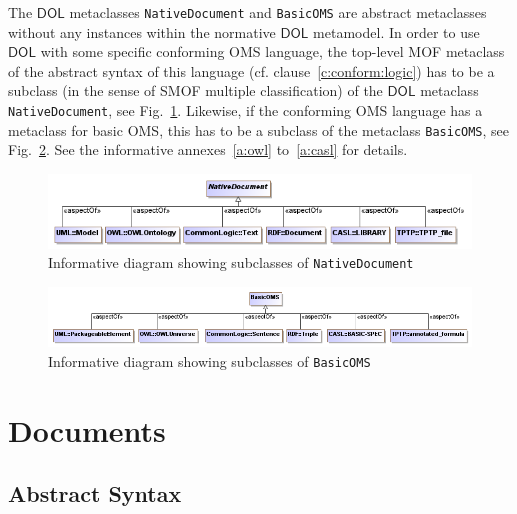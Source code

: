 \documentclass[10pt,fleqn,final]{scrreprt}
\makeatletter
\newcommand*{\cf}{cf.\@\xspace}
\newcommand*{\syntax}[1]{\texttt{#1}}
\newcommand*{\DOL}{\ensuremath{\mathsf{DOL}}\xspace}
\newcommand{\clauserefname}{clause}
\newcommand{\cref}[1]{\clauserefname~\ref{#1}}
\newcommand{\sclause}[1]{\section{#1}}
\newcommand{\ssclause}[1]{\subsection{#1}}
\newenvironment{definitions}[0]{\medskip }{}
\makeatother
\begin{document}
\begin{definitions}
The \DOL metaclasses \syntax{NativeDocument} and \syntax{BasicOMS} are
abstract metaclasses without any instances within the normative \DOL
metamodel.  In order to use \DOL with some specific conforming OMS language, the top-level MOF
metaclass of the abstract syntax of this language
(\cf \cref{c:conform:logic}) has to be a subclass (in the sense of
SMOF multiple classification) of the \DOL metaclass
\syntax{NativeDocument}, see Fig.~\ref{fig:native_document}. 
Likewise, if the conforming OMS language has a metaclass for basic OMS,
this has to be a subclass of the metaclass \syntax{BasicOMS},
see Fig.~\ref{fig:basic_oms}.
See the informative annexes~\ref{a:owl} to~\ref{a:casl} for details.


\begin{figure}
  \centering
    \includegraphics[scale=0.47]{mof/native_document.png}
   \caption{Informative diagram showing subclasses of \syntax{NativeDocument}}
   \label{fig:native_document}
\end{figure}


\begin{figure}
  \centering
    \includegraphics[scale=0.47]{mof/basic_oms.png}
   \caption{Informative diagram showing subclasses of \syntax{BasicOMS}}
   \label{fig:basic_oms}
\end{figure}





\sclause{Documents}\label{c:libraries}
\ssclause{Abstract Syntax}


\end{definitions}
\end{document}
